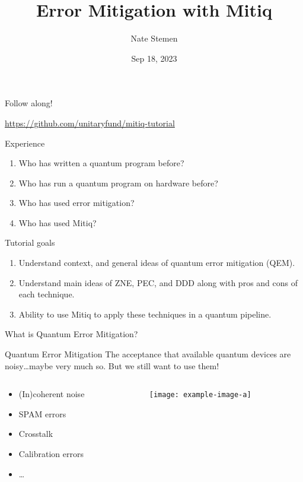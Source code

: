 \documentclass[11pt,aspectratio=1610,xcolor=dvipsnames]{beamer}
\title{Error Mitigation with Mitiq}
\date{Sep 18, 2023}
\author{Nate Stemen}
\institute{Unitary Fund}
\begin{document}
\maketitle

\begin{frame}{Follow along!}
	\begin{center}

		\url{https://github.com/unitaryfund/mitiq-tutorial}
	\end{center}
\end{frame}

\begin{frame}{Experience}
	\begin{enumerate}
		\item Who has written a quantum program before?
		\item Who has run a quantum program on hardware before?
		\item Who has used error mitigation?
		\item Who has used Mitiq?
	\end{enumerate}
\end{frame}

\begin{frame}{Tutorial goals}
	\begin{enumerate}
		\item Understand context, and general ideas of quantum error mitigation (QEM).
		\item Understand main ideas of ZNE, PEC, and DDD along with pros and cons of each technique.
		\item Ability to use Mitiq to apply these techniques in a quantum pipeline.
	\end{enumerate}
\end{frame}

\begin{frame}{What is Quantum Error Mitigation?}
	\begin{block}{Quantum Error Mitigation}
		The acceptance that available quantum devices are noisy\ldots maybe very much so.
		But we still want to use them!
	\end{block}
	\begin{columns}
		\begin{column}{0.35\textwidth}
			\begin{itemize}
				\item (In)coherent noise
				\item SPAM errors
				\item Crosstalk
				\item Calibration errors
				\item \dots
			\end{itemize}
		\end{column}
		\begin{column}{0.6\textwidth}
			\begin{figure}[H]
				\centering
				\texttt{[image: example-image-a]}
			\end{figure}
		\end{column}
	\end{columns}
\end{frame}
\end{document}
